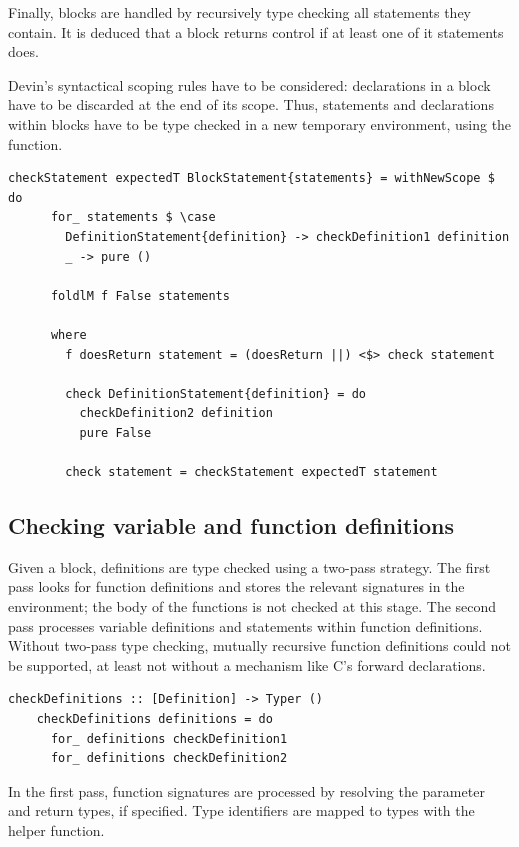 \documentclass[UdineBachThesis,american,11pt]{PhdThesis}
\begin{document}
  Finally, blocks are handled by recursively type checking all statements they
  contain. It is deduced that a block returns control if at least one of it
  statements does.

  Devin's syntactical scoping rules have to be considered: declarations in a
  block have to be discarded at the end of its scope. Thus, statements and
  declarations within blocks have to be type checked in a new temporary
  environment, using the \lstinline@withNewScope@ function.

  \begin{lstlisting}[gobble=4,basicstyle=\ttfamily\small]
    checkStatement expectedT BlockStatement{statements} = withNewScope $ do
      for_ statements $ \case
        DefinitionStatement{definition} -> checkDefinition1 definition
        _ -> pure ()

      foldlM f False statements

      where
        f doesReturn statement = (doesReturn ||) <$> check statement

        check DefinitionStatement{definition} = do
          checkDefinition2 definition
          pure False

        check statement = checkStatement expectedT statement
  \end{lstlisting}

  \newpage

  \subsection{Checking variable and function definitions}

  Given a block, definitions are type checked using a two-pass strategy. The
  first pass looks for function definitions and stores the relevant signatures
  in the environment; the body of the functions is not checked at this stage.
  The second pass processes variable definitions and statements within function
  definitions. Without two-pass type checking, mutually recursive function
  definitions could not be supported, at least not without a mechanism like C's
  forward declarations.

  \begin{lstlisting}[gobble=4,basicstyle=\ttfamily\small]
    checkDefinitions :: [Definition] -> Typer ()
    checkDefinitions definitions = do
      for_ definitions checkDefinition1
      for_ definitions checkDefinition2
  \end{lstlisting}

  In the first pass, function signatures are processed by resolving the
  parameter and return types, if specified. Type identifiers are mapped to types
  with the \lstinline@getType@ helper function.
\end{document}
